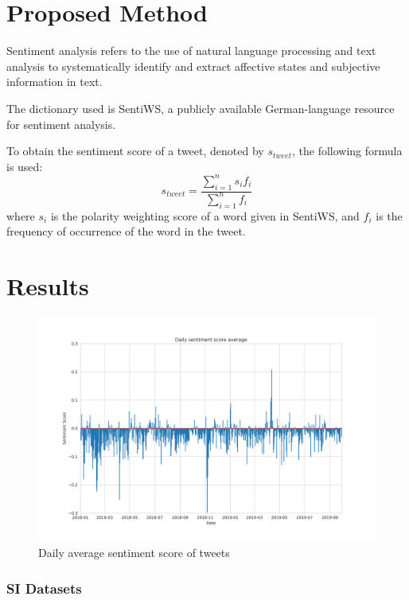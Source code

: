 \documentclass[9pt,twocolumn,twoside,lineno]{pnas-new}
\begin{document}
\section*{Proposed Method}

Sentiment analysis refers to the use of natural language processing and text analysis to systematically identify and extract affective states and subjective information in text. %

The dictionary used is SentiWS, a publicly available German-language resource for sentiment analysis. \cite{REMUS10.490}

To obtain the sentiment score of a tweet, denoted by \(s_{tweet}\), the following formula is used: \[s_{tweet} = \frac{\sum_{i=1}^{n} s_i f_i}{\sum_{i=1}^{n} f_i}\] where \(s_i\) is the polarity weighting score of a word given in SentiWS, and \(f_i\) is the frequency of occurrence of the word in the tweet. 

\section*{Results}

\begin{figure} 
	\begin{center}
		\includegraphics[width=\linewidth]{figures/dailyavgsenti}
	\end{center}
	\caption{Daily average sentiment score of tweets}
	\label{fig:tweet_score}
\end{figure}



\subsubsection*{SI Datasets} 
\end{document}
